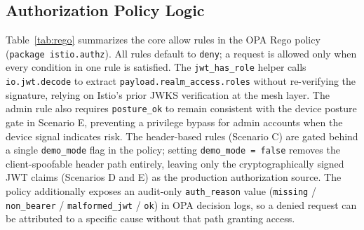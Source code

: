 \documentclass[conference]{IEEEtran}
\begin{document}
\subsection{Authorization Policy Logic}
\begin{sloppypar}
Table~\ref{tab:rego} summarizes the core allow rules in the OPA Rego policy
(\texttt{package istio.authz}). All rules default to \texttt{deny}; a request
is allowed only when every condition in one rule is satisfied. The
\texttt{jwt\_has\_role} helper calls \texttt{io.jwt.decode} to extract
\texttt{payload.realm\_access.roles} without re-verifying the signature,
relying on Istio's prior JWKS verification at the mesh layer. The admin rule
also requires \texttt{posture\_ok} to remain consistent with the device posture
gate in Scenario E, preventing a privilege bypass for admin accounts when the
device signal indicates risk. The header-based rules (Scenario C) are gated behind
a single \texttt{demo\_mode} flag in the policy; setting \texttt{demo\_mode = false}
removes the client-spoofable header path entirely, leaving only the cryptographically
signed JWT claims (Scenarios D and E) as the production authorization source. The
policy additionally exposes an audit-only \texttt{auth\_reason} value
(\texttt{missing} / \texttt{non\_bearer} / \texttt{malformed\_jwt} / \texttt{ok})
in OPA decision logs, so a denied request can be attributed to a specific cause
without that path granting access.
\end{sloppypar}
\end{document}
